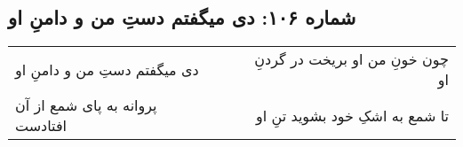 \begin{center}
\section*{شماره ۱۰۶: دی میگفتم دستِ من و دامنِ او}
\label{sec:106}
\begin{longtable}{l p{0.5cm} r}
دی میگفتم دستِ من و دامنِ او
&&
چون خونِ من او بریخت در گردنِ او
\\
پروانه به پای شمع از آن افتادست
&&
تا شمع به اشکِ خود بشوید تنِ او
\\
\end{longtable}
\end{center}
